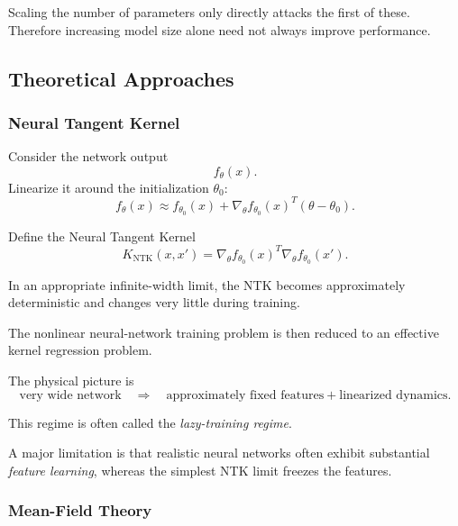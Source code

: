 Scaling the number of parameters only directly attacks the first of these.
Therefore increasing model size alone need not always improve performance.


\subsection{Theoretical Approaches}

\subsubsection{Neural Tangent Kernel}

Consider the network output
\begin{equation}
    f_\theta(x).
\end{equation}
Linearize it around the initialization $\theta_0$:
\begin{equation}
    f_\theta(x)
    \approx
    f_{\theta_0}(x)
    +
    \nabla_\theta f_{\theta_0}(x)^T
    (\theta-\theta_0).
\end{equation}

Define the Neural Tangent Kernel
\begin{equation}
    K_{\mathrm{NTK}}(x,x')
    =
    \nabla_\theta f_{\theta_0}(x)^T
    \nabla_\theta f_{\theta_0}(x').
\end{equation}

In an appropriate infinite-width limit, the NTK becomes approximately
deterministic and changes very little during training.

The nonlinear neural-network training problem is then reduced to an effective
kernel regression problem.

The physical picture is
\begin{equation}
    \boxed{
    \text{very wide network}
    \quad\Rightarrow\quad
    \text{approximately fixed features}
    +
    \text{linearized dynamics}.
    }
\end{equation}

This regime is often called the \emph{lazy-training regime}.

A major limitation is that realistic neural networks often exhibit substantial
\emph{feature learning}, whereas the simplest NTK limit freezes the features.


\subsubsection{Mean-Field Theory}
\label{sec:meanfield}


